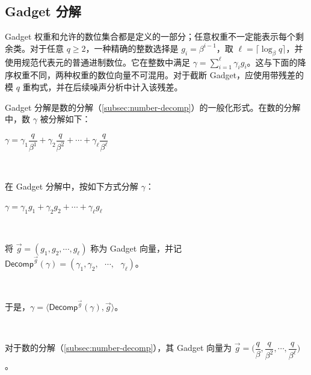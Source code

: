 \subsection{Gadget 分解}
\label{subsec:gadget-decomposition}

Gadget 权重和允许的数位集合都是定义的一部分；任意权重不一定能表示每个剩余类。对于任意 $q\ge2$，一种精确的整数选择是 $g_i=\beta^{i-1}$，取 $\ell=\lceil\log_\beta q\rceil$，并使用规范代表元的普通进制数位。它在整数中满足 $\gamma=\sum_{i=1}^{\ell}\gamma_i g_i$。这与下面的降序权重不同，两种权重的数位向量不可混用。对于截断 Gadget，应使用带残差的模 $q$ 重构式，并在后续噪声分析中计入该残差。

Gadget 分解是数的分解（\autoref{subsec:number-decomp}）的一般化形式。在数的分解中，数 $\gamma$ 被分解如下：

$\gamma = \gamma_1 \dfrac{q}{\beta^1} + \gamma_2 \dfrac{q}{\beta^2} + \cdots + \gamma_\ell \dfrac{q}{\beta^\ell} $

$ $

在 Gadget 分解中，按如下方式分解 $\gamma$：

$\gamma = \gamma_1 g_1 + \gamma_2 g_2 + \cdots + \gamma_\ell g_\ell $

$ $

将 $\vec{g} = (g_1, g_2, \cdots, g_\ell)$ 称为 Gadget 向量，并记 $\textsf{Decomp}^{\vec{g}}(\gamma) = (\gamma_1, \gamma_2, \text{ } \cdots , \text{ } \gamma_\ell) $。

$ $

于是，$\gamma = \langle \textsf{Decomp}^{\vec{g}}(\gamma), \vec{g} \rangle $。

$ $

对于数的分解（\autoref{subsec:number-decomp}），其 Gadget 向量为 $\vec{g} = \Bigg(\dfrac{q}{\beta}, \dfrac{q}{\beta^2}, \cdots, \dfrac{q}{\beta^\ell}\Bigg)$。